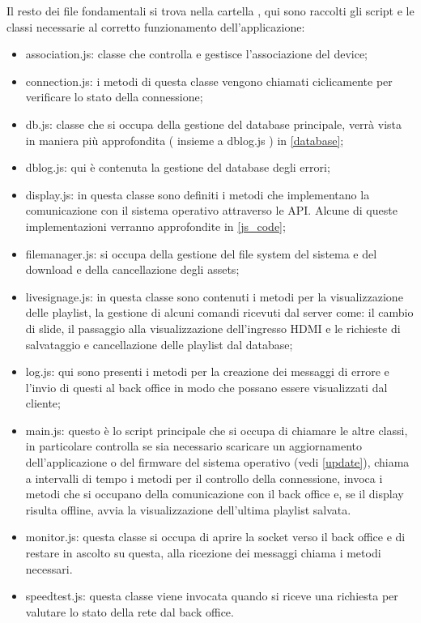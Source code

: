 Il resto dei file fondamentali si trova nella cartella , qui sono raccolti gli script e le classi necessarie al corretto funzionamento dell'applicazione:

\begin{itemize}
    \item association.js: classe che controlla e gestisce l'associazione del device;
    \item connection.js: i metodi di questa classe vengono chiamati ciclicamente per verificare lo stato della connessione;
    \item db.js: classe che si occupa della gestione del database principale, verrà vista in maniera più approfondita ( insieme a dblog.js ) in \ref*{database};
    \item dblog.js: qui è contenuta la gestione del database degli errori;
    \item display.js: in questa classe sono definiti i metodi che implementano la comunicazione con il sistema operativo attraverso le API. Alcune di queste implementazioni verranno approfondite in \ref*{js_code};
    \item filemanager.js: si occupa della gestione del file system del sistema e del download e della cancellazione degli assets;
    \item livesignage.js: in questa classe sono contenuti i metodi per la visualizzazione delle playlist, la gestione di alcuni comandi ricevuti dal server come: il cambio di slide, il passaggio alla visualizzazione dell'ingresso HDMI e le richieste di salvataggio e cancellazione delle playlist dal database;
    \item log.js: qui sono presenti i metodi per la creazione dei messaggi di errore e l'invio di questi al back office in modo che possano essere visualizzati dal cliente;
    \item main.js: questo è lo script principale che si occupa di chiamare le altre classi, in particolare controlla se sia necessario scaricare un aggiornamento dell'applicazione o del firmware del sistema operativo (vedi \ref*{update}), chiama a intervalli di tempo i metodi per il controllo della connessione, invoca i metodi che si occupano della comunicazione con il back office e, se il display risulta offline, avvia la visualizzazione dell'ultima playlist salvata.
    \item monitor.js: questa classe si occupa di aprire la socket verso il back office e di restare in ascolto su questa, alla ricezione dei messaggi chiama i metodi necessari.
    \item speedtest.js: questa classe viene invocata quando si riceve una richiesta per valutare lo stato della rete dal back office.
\end{itemize}

